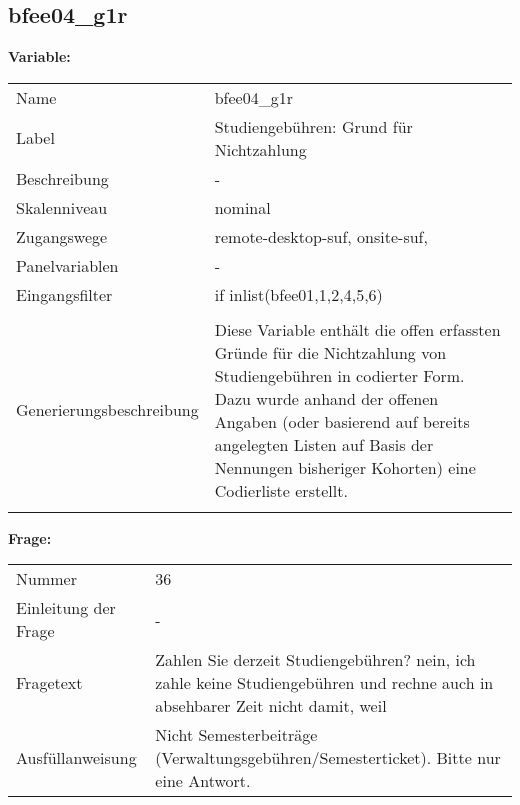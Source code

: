 	
	
	\subsection{bfee04\_g1r}
	\label{subSection:bfee04_g1r}

	\noindent\textbf{Variable:}\\
		\begin{tabular}{lL{11.3cm}}
			\label{tableVariable:bfee04_g1r}
			Name & bfee04\_g1r \\
			Label & Studiengebühren: Grund für Nichtzahlung \\
			Beschreibung & - \\
			Skalenniveau & nominal \\
			Zugangswege &
				remote-desktop-suf,
				onsite-suf,
 \\
			Panelvariablen & -
			 \\
			Eingangsfilter & if inlist(bfee01,1,2,4,5,6) \\
 \\
					Generierungsbeschreibung & Diese Variable enthält die offen erfassten Gründe für die Nichtzahlung von Studiengebühren in codierter Form. Dazu wurde anhand der offenen Angaben (oder basierend auf bereits angelegten Listen auf Basis der Nennungen bisheriger Kohorten) eine Codierliste erstellt.

				 \\	
			 \\
		\end{tabular}

		\vspace*{1 cm}
		\noindent\textbf{Frage:}\\
		\begin{tabular}{lL{11.3cm}}
			\label{tableQuestion:bfee04_g1r}
			Nummer & 36 \\
			Einleitung der Frage & - \\
			Fragetext & Zahlen Sie derzeit Studiengebühren?
nein, ich zahle keine Studiengebühren und rechne auch in absehbarer Zeit nicht damit, weil \\
			Ausfüllanweisung & Nicht Semesterbeiträge (Verwaltungsgebühren/Semesterticket). Bitte nur eine Antwort. \\
		\end{tabular}





